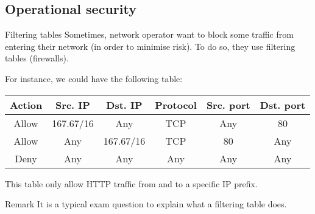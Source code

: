 \documentclass[a4paper]{article}
\begin{document}
\subsection{Operational security}
\begin{parag}{Filtering tables}
    Sometimes, network operator want to block some traffic from entering their network (in order to minimise risk). To do so, they use filtering tables (firewalls). 

    For instance, we could have the following table:
    \begin{center}
    \begin{tabular}{|c|ccccc|}
        \hline
        \textbf{Action} & \textbf{Src. IP} & \textbf{Dst. IP} & \textbf{Protocol} & \textbf{Src. port} & \textbf{Dst. port} \\
        \hline
        Allow & 167.67/16 & Any & TCP & Any & 80 \\
        Allow & Any & 167.67/16 & TCP & 80 & Any \\
        Deny & Any & Any & Any & Any & Any  \\
        \hline
    \end{tabular}
    \end{center}

    This table only allow HTTP traffic from and to a specific IP prefix.

    \begin{subparag}{Remark}
        It is a typical exam question to explain what a filtering table does.
    \end{subparag}
\end{parag}
\end{document}
